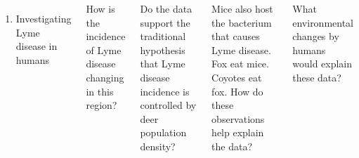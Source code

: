 \begin{frame}[t]
    \begin{adjustwidth}{-2em}{-1.5em}
        \vspace{-3mm}
        \begin{columns}[t]


            \vspace{-4mm}
            \begin{enumerate}
                \addtocounter{enumi}{1}
                \item Investigating Lyme disease in humans
            \end{enumerate}

            \vspace{1mm}
            {\small
                How is the incidence of Lyme disease changing in this region?


                Do the data support the traditional hypothesis that Lyme
                disease incidence is controlled by deer population density?


                Mice also host the bacterium that causes Lyme disease.  Fox eat
                mice. Coyotes eat fox.  How do these observations help explain
                the data?


                What environmental changes by humans would explain these data?

                     }




\end{columns}
\end{adjustwidth}
\end{frame}
